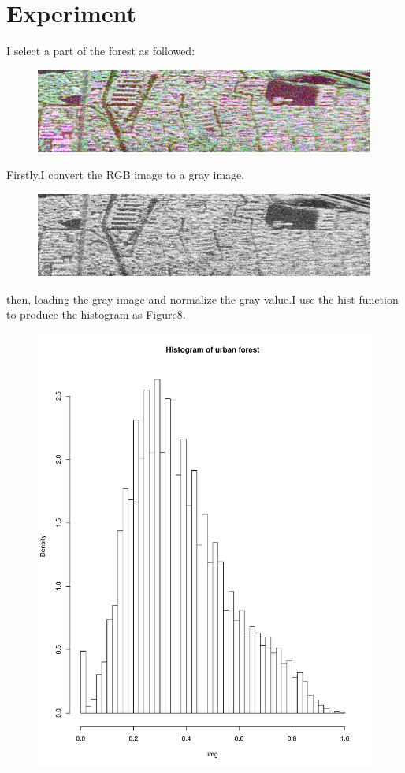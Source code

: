 \documentclass{book} %
\begin{document}
\section{Experiment}
I select  a part of the forest as followed:
\begin{figure}[H]
	\centering
	\includegraphics[width=0.7\linewidth]{sar_home_work2}
	\caption{}
	\label{fig:sarhomework2}
\end{figure}
Firstly,I convert the RGB image to a gray image.
\begin{figure}[H]
	\centering
	\includegraphics[width=0.7\linewidth]{sar_home_work1}
	\caption{}
	\label{fig:sarhomework1}
\end{figure}
then, loading the gray image and normalize the gray value.I use the hist function to produce the histogram as Figure8.
\begin{figure}[H]
	\centering
	\includegraphics[width=0.7\linewidth,height=0.4\textheight]{Rplot01}
	\caption{}
	\label{fig:rplot01}
\end{figure}
\end{document}
